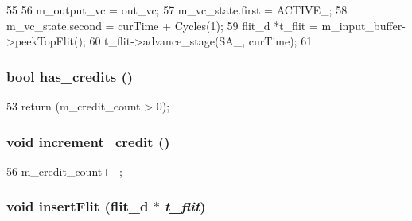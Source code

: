 \begin{DoxyCode}
55 {
56     m_output_vc = out_vc;
57     m_vc_state.first = ACTIVE_;
58     m_vc_state.second = curTime + Cycles(1);
59     flit_d *t_flit = m_input_buffer->peekTopFlit();
60     t_flit->advance_stage(SA_, curTime);
61 }
\end{DoxyCode}
\hypertarget{classVirtualChannel__d_a67a31e9d15b406c89bd971df2e57e91d}{
\subsubsection[{has\_\-credits}]{\setlength{\rightskip}{0pt plus 5cm}bool has\_\-credits ()}}
\label{classVirtualChannel__d_a67a31e9d15b406c89bd971df2e57e91d}



\begin{DoxyCode}
53 { return (m_credit_count > 0); }
\end{DoxyCode}
\hypertarget{classVirtualChannel__d_a172163c0eb1a059fb22ead59c4e29d86}{
\subsubsection[{increment\_\-credit}]{\setlength{\rightskip}{0pt plus 5cm}void increment\_\-credit ()}}
\label{classVirtualChannel__d_a172163c0eb1a059fb22ead59c4e29d86}



\begin{DoxyCode}
56 { m_credit_count++; }
\end{DoxyCode}
\hypertarget{classVirtualChannel__d_a67ce8a357ade6711b2164ca4d96a7590}{
\subsubsection[{insertFlit}]{\setlength{\rightskip}{0pt plus 5cm}void insertFlit ({\bf flit\_\-d} $\ast$ {\em t\_\-flit})}}
\label{classVirtualChannel__d_a67ce8a357ade6711b2164ca4d96a7590}




